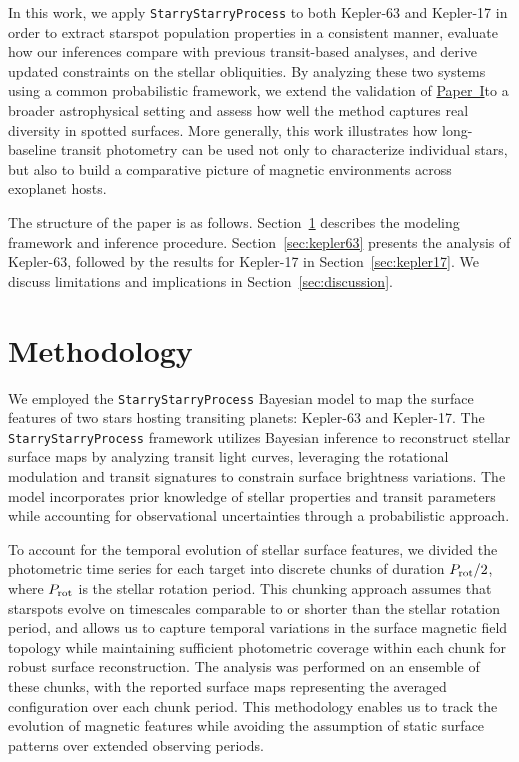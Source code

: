 \documentclass[twocolumn]{aastex631}
\newcommand{\paperone}{\hyperlink{cite.paper1}{Paper~I}}
\begin{document}
In this work, we apply \texttt{StarryStarryProcess} to both Kepler-63 and Kepler-17 in order to  
extract starspot population properties in a consistent manner, evaluate how our inferences compare with 
previous transit-based analyses, and derive updated constraints on the stellar obliquities. 
By analyzing these two systems using a common probabilistic framework, we extend the validation of 
\paperone to a broader astrophysical setting and assess how well the method captures real diversity in 
spotted surfaces. More generally, this work illustrates how long-baseline transit photometry can 
be used not only to characterize individual stars, but also to build a comparative picture of 
magnetic environments across exoplanet hosts.

The structure of the paper is as follows. Section~\ref{sec:model} describes the 
modeling framework and inference procedure. Section~\ref{sec:kepler63} presents 
the analysis of Kepler-63, followed by the results for Kepler-17 in Section~\ref{sec:kepler17}. 
We discuss limitations and implications in Section~\ref{sec:discussion}.

\section{Methodology}
\label{sec:model}
We employed the \texttt{StarryStarryProcess} \citep[][]{paper1} Bayesian model to map the surface features of 
two stars hosting transiting planets: Kepler-63 and Kepler-17. The \texttt{StarryStarryProcess} 
framework utilizes Bayesian inference to reconstruct stellar surface maps by analyzing transit light curves, 
leveraging the rotational modulation and transit signatures to constrain surface brightness variations. 
The model incorporates prior knowledge of stellar properties and transit parameters while accounting for 
observational uncertainties through a probabilistic approach.

To account for the temporal evolution of stellar surface features, we divided the photometric time series for 
each target into discrete chunks of duration $P_{\rm rot}/2$, where $P_{\rm rot}$ is the stellar rotation period. 
This chunking approach assumes that starspots evolve on timescales comparable to or shorter than the stellar 
rotation period, and allows us to capture temporal variations in the surface magnetic field topology while 
maintaining sufficient photometric coverage within each chunk for robust surface reconstruction. 
The analysis was performed on an ensemble of these chunks, with the reported surface maps representing 
the averaged configuration over each chunk period. This methodology enables us to track the evolution of 
magnetic features while avoiding the assumption of static surface patterns over extended observing periods.
\end{document}
